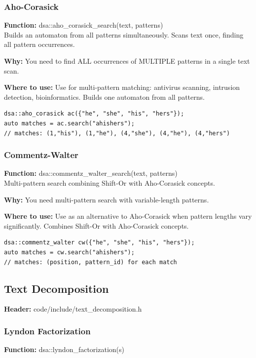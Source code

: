 \documentclass[11pt]{article}
\begin{document}
\subsubsection{Aho-Corasick}
\textbf{Function:} dsa::aho\_corasick\_search(text, patterns)\\

Builds an automaton from all patterns simultaneously. Scans text once, finding all pattern occurrences.

\textbf{Why:} You need to find ALL occurrences of MULTIPLE patterns in a single text scan. \par \textbf{Where to use:} Use for multi-pattern matching: antivirus scanning, intrusion detection, bioinformatics. Builds one automaton from all patterns.

\begin{lstlisting}
dsa::aho_corasick ac({"he", "she", "his", "hers"});
auto matches = ac.search("ahishers");
// matches: (1,"his"), (1,"he"), (4,"she"), (4,"he"), (4,"hers")
\end{lstlisting}

\subsubsection{Commentz-Walter}
\textbf{Function:} dsa::commentz\_walter\_search(text, patterns)\\

Multi-pattern search combining Shift-Or with Aho-Corasick concepts.

\textbf{Why:} You need multi-pattern search with variable-length patterns. \par \textbf{Where to use:} Use as an alternative to Aho-Corasick when pattern lengths vary significantly. Combines Shift-Or with Aho-Corasick concepts.

\begin{lstlisting}
dsa::commentz_walter cw({"he", "she", "his", "hers"});
auto matches = cw.search("ahishers");
// matches: (position, pattern_id) for each match
\end{lstlisting}

\subsection{Text Decomposition}
\textbf{Header:} code/include/text\_decomposition.h

\subsubsection{Lyndon Factorization}
\textbf{Function:} dsa::lyndon\_factorization(s)\\
\end{document}
